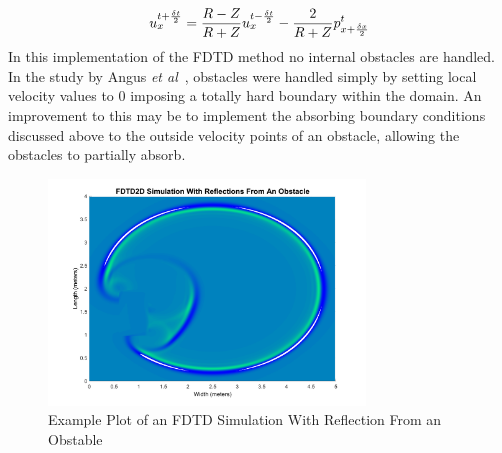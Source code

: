 \begin{equation}
u^{t + \frac{\delta t}{2}}_{x} = \frac{R - Z}{R + Z} u^{t - \frac{\delta t}{2}}_{x} - \frac{2}{R + Z} p^{t}_{x+ \frac{\delta x}{2}}\\
\end{equation}
In this implementation of the FDTD method no internal obstacles are handled. In the study by Angus \textit{et al}~\cite{Angus2010}, obstacles were handled simply by setting local velocity  values to 0 imposing a totally hard boundary within the domain. An improvement to this may be to implement the absorbing boundary conditions discussed above to the outside velocity points of an obstacle, allowing the obstacles to partially absorb.
\begin{figure}[H]
\centering
  \includegraphics[width=0.75\textwidth]{./graphics/fdtd2dReflectingObstacle.png}
  \caption{Example Plot of an FDTD Simulation With Reflection From an Obstable}
\end{figure}
\newpage
